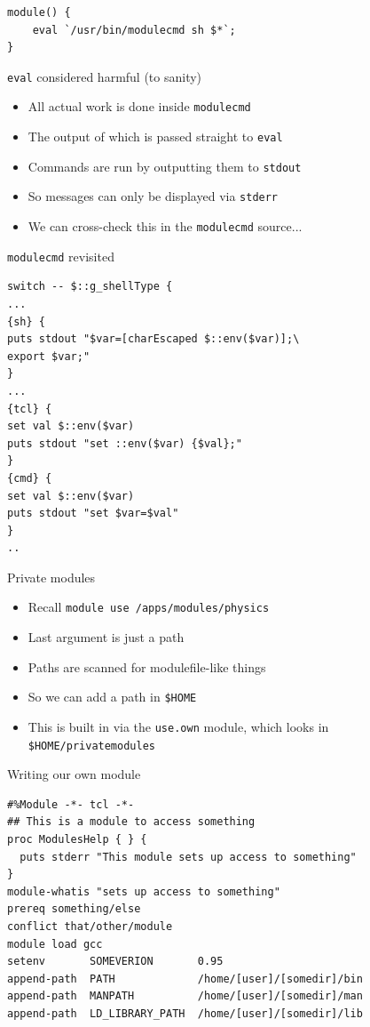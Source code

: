\documentclass[handout]{beamer}
\begin{document}
\begin{frame}[fragile]{}{}
	{\LARGE \begin{verbatim}
module() { 
    eval `/usr/bin/modulecmd sh $*`; 
}
\end{verbatim}

}
\end{frame}

\begin{frame}{\texttt{eval} considered harmful (to sanity)}
\begin{itemize}[<+->]
	\item All actual work is done inside \texttt{modulecmd}
	\item The output of which is passed straight to \texttt{eval}
	\item Commands are run by outputting them to \texttt{stdout}
	\item So messages can only be displayed via \texttt{stderr}
	\item We can cross-check this in the \texttt{modulecmd} source...
\end{itemize}
\end{frame}

\begin{frame}[fragile]{\texttt{modulecmd} revisited}
\begin{verbatim}
switch -- $::g_shellType {
...
{sh} {
puts stdout "$var=[charEscaped $::env($var)];\
export $var;"
}
...
{tcl} {
set val $::env($var)
puts stdout "set ::env($var) {$val};"
}
{cmd} {
set val $::env($var)
puts stdout "set $var=$val"
}	
..
\end{verbatim}

\end{frame}

\begin{frame}[fragile]{Private modules}
	\begin{itemize}[<+->]
		\item Recall \verb|module use /apps/modules/physics|
		\item Last argument is just a path
		\item Paths are scanned for modulefile-like things
		\item So we can add a path in \verb|$HOME|
		\item This is built in via the \verb|use.own| module, which looks in \verb|$HOME/privatemodules|
	\end{itemize}
\end{frame}


\begin{frame}[fragile]{Writing our own module}
	\begin{verbatim}
#%Module -*- tcl -*-
## This is a module to access something
proc ModulesHelp { } {
  puts stderr "This module sets up access to something" 
}
module-whatis "sets up access to something"
prereq something/else
conflict that/other/module
module load gcc
setenv       SOMEVERION       0.95
append-path  PATH             /home/[user]/[somedir]/bin
append-path  MANPATH          /home/[user]/[somedir]/man
append-path  LD_LIBRARY_PATH  /home/[user]/[somedir]/lib
\end{verbatim}
\end{frame}
\end{document}

